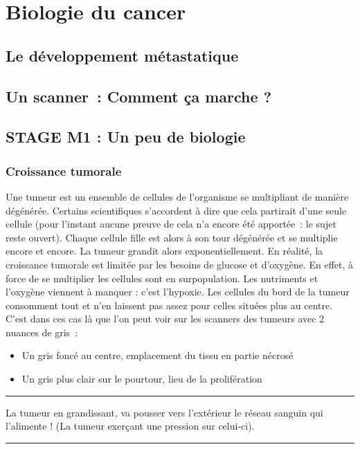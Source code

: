 \documentclass[main.tex]{subfiles}
\begin{document}
\chapter{Biologie du cancer}

\section{Le développement métastatique}

\section{Un scanner~: Comment ça marche ?}

\section{STAGE M1 : Un peu de biologie}
\subsection{Croissance tumorale}
Une tumeur est un ensemble de cellules de l'organisme se multipliant de manière dégénérée. Certains scientifiques s'accordent à dire que cela partirait d'une seule cellule (pour l'instant aucune preuve de cela n'a encore été apportée~: le sujet reste ouvert). Chaque cellule fille est alors à son tour dégénérée et se multiplie encore et encore. La tumeur grandit alors exponentiellement. En réalité, la croissance tumorale est limitée par les besoins de glucose et d'oxygène. En effet, à force de se multiplier les cellules sont en surpopulation. Les nutriments et l'oxygène viennent à manquer : c'est l'hypoxie. Les cellules du bord de la tumeur consomment tout et n'en laissent pas assez pour celles situées plus au centre. C'est dans ces cas là que l'on peut voir sur les scanners des tumeurs avec 2 nuances de gris~:
\begin{itemize}
\item Un gris foncé au centre, emplacement du tissu en partie nécrosé
\item Un gris plus clair sur le pourtour, lieu de la prolifération
\end{itemize}

\hrule
La tumeur en grandissant, va pousser vers l'extérieur le réseau sanguin qui l'alimente ! (La tumeur exerçant une pression sur celui-ci). 
\hrule
\end{document}
